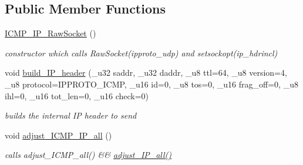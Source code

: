 \subsection*{Public Member Functions}
\begin{CompactItemize}
\item 
\hypertarget{classsocketpp_1_1ICMP__IP__RawSocket_c94fd53fce785a8b9ac5e53c8b1fb694}{
\hyperlink{classsocketpp_1_1ICMP__IP__RawSocket_c94fd53fce785a8b9ac5e53c8b1fb694}{ICMP\_\-IP\_\-RawSocket} ()}
\label{classsocketpp_1_1ICMP__IP__RawSocket_c94fd53fce785a8b9ac5e53c8b1fb694}

\begin{CompactList}\small\item\em constructor which calls RawSocket(ipproto\_\-udp) and setsockopt(ip\_\-hdrincl) \item\end{CompactList}\item 
\hypertarget{classsocketpp_1_1ICMP__IP__RawSocket_08d5813e94daff127499b2d1f7e93324}{
void \hyperlink{classsocketpp_1_1ICMP__IP__RawSocket_08d5813e94daff127499b2d1f7e93324}{build\_\-IP\_\-header} (\_\-u32 saddr, \_\-u32 daddr, \_\-u8 ttl=64, \_\-u8 version=4, \_\-u8 protocol=IPPROTO\_\-ICMP, \_\-u16 id=0, \_\-u8 tos=0, \_\-u16 frag\_\-off=0, \_\-u8 ihl=0, \_\-u16 tot\_\-len=0, \_\-u16 check=0)}
\label{classsocketpp_1_1ICMP__IP__RawSocket_08d5813e94daff127499b2d1f7e93324}

\begin{CompactList}\small\item\em builds the internal IP header to send \item\end{CompactList}\item 
\hypertarget{classsocketpp_1_1ICMP__IP__RawSocket_c3f54f7a266586af46e4bfa4494f90d6}{
void \hyperlink{classsocketpp_1_1ICMP__IP__RawSocket_c3f54f7a266586af46e4bfa4494f90d6}{adjust\_\-ICMP\_\-IP\_\-all} ()}
\label{classsocketpp_1_1ICMP__IP__RawSocket_c3f54f7a266586af46e4bfa4494f90d6}

\begin{CompactList}\small\item\em calls adjust\_\-ICMP\_\-all() \&\& \hyperlink{classsocketpp_1_1IP__RawSocket_45e60510233daaa2f279d3a4706fdce5}{adjust\_\-IP\_\-all()} \item\end{CompactList}\end{CompactItemize}
